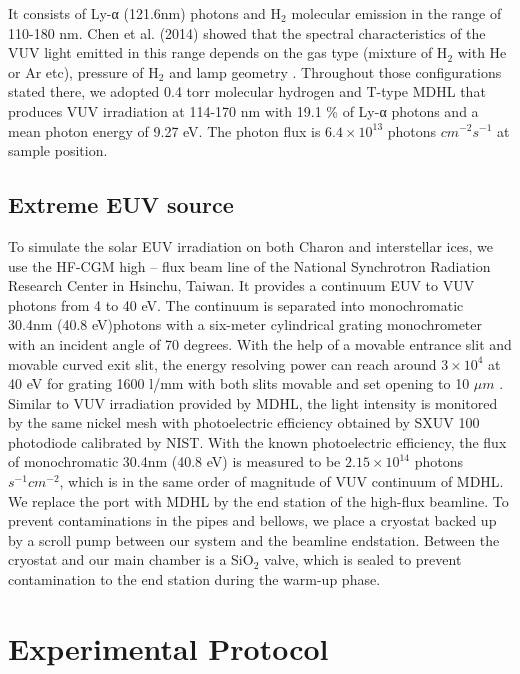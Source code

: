 It consists of Ly-α (121.6nm) photons and H$_2$ molecular emission in the range of 110-180 nm. Chen et al. (2014) showed that the spectral characteristics of the VUV light emitted in this range depends on the gas type (mixture of H$_2$ with He or Ar etc), pressure of H$_2$ and lamp geometry \cite{chen2013vacuum}. Throughout those configurations stated there, we adopted 0.4 torr molecular hydrogen and T-type MDHL that produces VUV irradiation at 114-170 nm with 19.1 \% of Ly-α photons and a mean photon energy of 9.27 eV. The photon flux is $6.4 \times 10^{13}$ photons $cm^{-2} s^{-1}$ at sample position.

\subsection{Extreme EUV source}
\label{sec:Extreme_EUV_source}

To simulate the solar EUV irradiation on both Charon and interstellar ices, we use the HF-CGM high – flux beam line of the National Synchrotron Radiation Research Center in Hsinchu, Taiwan. It provides a continuum EUV to VUV photons from 4 to 40 eV. The continuum is separated into monochromatic 30.4nm (40.8 eV)photons with a six-meter cylindrical grating monochrometer with an incident angle of 70 degrees. With the help of a movable entrance slit and movable curved exit slit, the energy resolving power can reach around $3 \times 10^4$ at 40 eV for grating 1600 l/mm with both slits movable and set opening to 10 $\mu m$ \cite{hsieh1998design}. Similar to VUV irradiation provided by MDHL, the light intensity is monitored by the same nickel mesh with photoelectric efficiency obtained by SXUV 100 photodiode calibrated by NIST. With the known photoelectric efficiency, the flux of monochromatic 30.4nm (40.8 eV) is measured to be $2.15 \times 10^{14}$ photons $s^{-1} cm^{-2}$, which is in the same order of magnitude of VUV continuum of MDHL. We replace the port with MDHL by the end station of the high-flux beamline. To prevent contaminations in the pipes and bellows, we place a cryostat backed up by a scroll pump between our system and the beamline endstation. Between the cryostat and our main chamber is a SiO$_2$ valve, which is sealed to prevent contamination to the end station during the warm-up phase.

\section{Experimental Protocol}
\label{sec:Experimental_Protocol}

